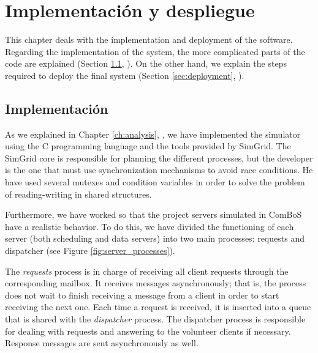 \chead[]{}
\renewcommand{\headrulewidth}{0.5pt}

\lfoot[]{}
\cfoot[]{}
\rfoot[]{}
\renewcommand{\footrulewidth}{0pt}

\chapter{Implementación y despliegue}
\label{ch:implementation_and_deployment}

This chapter deals with the implementation and deployment of the software. Regarding the implementation of the system, the more complicated parts of the code are explained (Section \ref{sec:implementation}, \textit{}). On the other hand, we explain the steps required to deploy the final system (Section \ref{sec:deployment}, \textit{}).

\section{Implementación}
\label{sec:implementation}

As we explained in Chapter \ref{ch:analysis}, \textit{}, we have implemented the simulator using the C programming language and the tools provided by SimGrid. The SimGrid core is responsible for planning the different processes, but the developer is the one that must use synchronization mechanisms to avoid race conditions. He have used several mutexes and condition variables in order to solve the problem of reading-writing in shared structures. 

Furthermore, we have worked so that the project servers simulated in ComBoS have a realistic behavior. To do this, we have divided the functioning of each server (both \gls{scheduling} and data servers) into two main processes: requests and \gls{dispatcher} (see Figure \ref{fig:server_processes}).

The \textit{requests} process is in charge of receiving all client requests through the corresponding mailbox. It receives messages asynchronously; that is, the process does not wait to finish receiving a message from a client in order to start receiving the next one. Each time a request is received, it is inserted into a queue that is shared with the \textit{\gls{dispatcher}} process. The \gls{dispatcher} process is responsible for dealing with requests and answering to the volunteer clients if necessary. Response messages are sent asynchronously as well.

